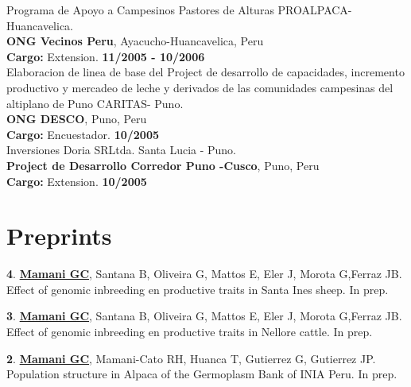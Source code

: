 \documentclass[margin,line,10pt]{res}
\newenvironment{list1}{
  \begin{list}{\ding{113}}{%
      \setlength{\itemsep}{0in}
      \setlength{\parsep}{0in} \setlength{\parskip}{0in}
      \setlength{\topsep}{0in} \setlength{\partopsep}{0in} 
      \setlength{\leftmargin}{0.17in}}}{\end{list}}
\begin{document}
\begin{resume}
Programa de Apoyo a Campesinos Pastores de Alturas PROALPACA-Huancavelica.\\
{\bf ONG Vecinos Peru}, Ayacucho-Huancavelica, Peru\\
\vspace{-.3cm}
\textbf{Cargo:} Extension.  \hfill {\bf 11/2005 - 10/2006}\\

Elaboracion de linea de base del Project de desarrollo de capacidades, incremento productivo y mercadeo de leche y derivados de las comunidades campesinas del altiplano de Puno CARITAS- Puno.\\
{\bf ONG DESCO}, Puno, Peru\\
\vspace{-.3cm}
\textbf{Cargo:} Encuestador.  \hfill {\bf 10/2005}\\

Inversiones Doria SRLtda. Santa Lucia - Puno.\\
{\bf Project de Desarrollo Corredor Puno -Cusco}, Puno, Peru\\
\vspace{-.3cm}
\textbf{Cargo:} Extension.  \hfill {\bf 10/2005}\\

\vspace{0.5cm}

\section{\sc Preprints}

\begin{list1}

\item [{\bf 4}.]  {\bf \underline{Mamani GC}}, Santana B, Oliveira G, Mattos E, Eler J, Morota G,Ferraz JB.   
     Effect of genomic inbreeding en productive traits in Santa Ines sheep. In prep. %
\vspace{0.5cm}
     
\item [{\bf 3}.]  {\bf \underline{Mamani GC}}, Santana B, Oliveira G, Mattos E, Eler J, Morota G,Ferraz JB.   
     Effect of genomic inbreeding en productive traits in Nellore cattle. In prep. %
\vspace{0.5cm}

\item [{\bf 2}.]  {\bf \underline{Mamani GC}}, Mamani-Cato RH, Huanca T, Gutierrez G, Gutierrez JP.   
     Population structure in Alpaca of the Germoplasm Bank of INIA Peru. In prep. %
\vspace{0.5cm}
 

\end{list1}
\end{resume}
\end{document}

